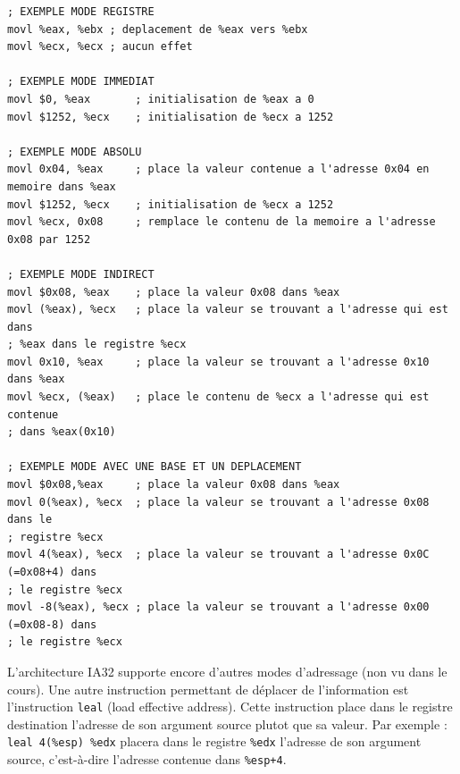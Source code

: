 \begin{lstlisting}[language={[x86masm]Assembler}, emph={\$,\%,(,),movl},emphstyle={\color{blue}\bfseries}]
; EXEMPLE MODE REGISTRE
movl %eax, %ebx	; deplacement de %eax vers %ebx
movl %ecx, %ecx	; aucun effet

; EXEMPLE MODE IMMEDIAT
movl $0, %eax		; initialisation de %eax a 0
movl $1252, %ecx	; initialisation de %ecx a 1252

; EXEMPLE MODE ABSOLU
movl 0x04, %eax		; place la valeur contenue a l'adresse 0x04 en memoire dans %eax
movl $1252,	%ecx	; initialisation de %ecx a 1252
movl %ecx, 0x08		; remplace le contenu de la memoire a l'adresse 0x08 par 1252

; EXEMPLE MODE INDIRECT
movl $0x08, %eax	; place la valeur 0x08 dans %eax
movl (%eax), %ecx	; place la valeur se trouvant a l'adresse qui est dans
; %eax dans le registre %ecx
movl 0x10, %eax		; place la valeur se trouvant a l'adresse 0x10 dans %eax
movl %ecx, (%eax)	; place le contenu de %ecx a l'adresse qui est contenue
; dans %eax(0x10)

; EXEMPLE MODE AVEC UNE BASE ET UN DEPLACEMENT
movl $0x08,%eax		; place la valeur 0x08 dans %eax
movl 0(%eax), %ecx	; place la valeur se trouvant a l'adresse 0x08 dans le
; registre %ecx
movl 4(%eax), %ecx	; place la valeur se trouvant a l'adresse 0x0C (=0x08+4) dans
; le registre %ecx
movl -8(%eax), %ecx	; place la valeur se trouvant a l'adresse 0x00 (=0x08-8) dans
; le registre %ecx
\end{lstlisting}
L'architecture IA32 supporte encore d'autres modes d'adressage (non vu dans le cours).
Une autre instruction permettant de déplacer de l'information est l'instruction \texttt{leal} (load effective address).
Cette instruction place dans le registre destination l'adresse de son argument source plutot que sa valeur.
Par exemple : \texttt{leal 4(\%esp) \%edx} placera dans le registre \texttt{\%edx} l'adresse de son argument source, c'est-à-dire l'adresse contenue dans \texttt{\%esp+4}.

